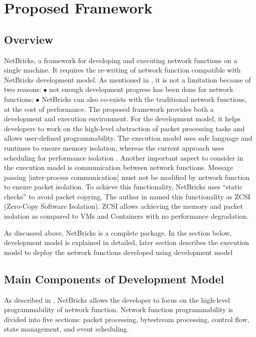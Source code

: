 \documentclass[10pt, a4paper, conference]{IEEEtran}
\begin{document}
\section{Proposed Framework}
\subsection*{Overview}
NetBricks, a framework for developing and executing network functions on a single machine. It requires the re-writing of network function compatible with NetBricks development model. As mentioned in \cite{Panda2016}, it is not a limitation because of two reasons: $\bullet$ not enough development progress has been done for network functions; $\bullet$ NetBricks can also co-exists with the traditional network functions, at the cost of performance.
The proposed framework provides both a development and execution environment. For the development model, it helps developers to work on the high-level abstraction of packet processing tasks and allows user-defined programmability. The execution model uses safe language and runtimes to ensure memory isolation, whereas the current approach uses scheduling for performance isolation \cite{Panda2016}. Another important aspect to consider in the execution model is communication between network functions. Message passing [inter-process communication] must not be modified by network function to ensure packet isolation. To achieve this functionality, NetBricks uses “static checks” to avoid packet copying. The author in \cite{Panda2016} named this functionality as ZCSI (Zero-Copy Software Isolation). ZCSI allows achieving the memory and packet isolation as compared to VMs and Containers with no performance degradation. 

As discussed above, NetBricks is a complete package. In the section below, development model is explained in detailed, later section describes the execution model to deploy the network functions developed using development model
\subsection{Main Components of Development Model}
 As described in \cite{Panda2016}, NetBricks allows the developer to focus on the high-level programmability of network function. Network function programmability is divided into five sections: packet processing, bytestream processing, control flow, state management, and event scheduling.
\end{document}
